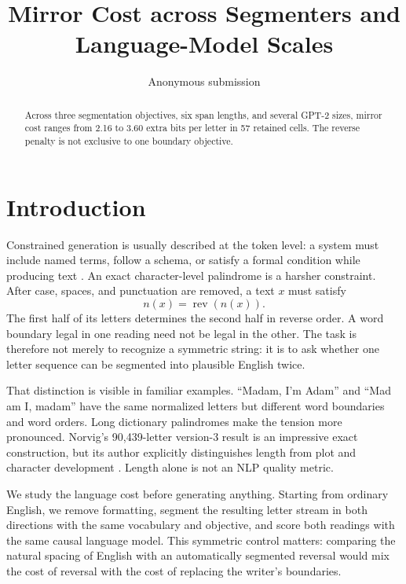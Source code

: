 \documentclass[11pt]{article}
\title{Mirror Cost across Segmenters and Language-Model Scales}
\author{Anonymous submission}
\newcommand{\norm}[1]{n(#1)}
\newcommand{\rev}{\operatorname{rev}}
\begin{document}
\maketitle

\begin{abstract}
Across three segmentation objectives, six span lengths, and several GPT-2 sizes, mirror cost ranges from 2.16 to 3.60 extra bits per letter in 57 retained cells. The reverse penalty is not exclusive to one boundary objective.
\end{abstract}

\section{Introduction}

Constrained generation is usually described at the token level: a system must
include named terms, follow a schema, or satisfy a formal condition while
producing text \citep{hokamp2017grid,post2018fast,lu2022astar}. An exact
character-level palindrome is a harsher constraint. After case, spaces, and
punctuation are removed, a text $x$ must satisfy
\begin{equation}
  \norm{x}=\rev(\norm{x}).
\end{equation}
The first half of its letters determines the second half in reverse order. A
word boundary legal in one reading need not be legal in the other. The task is
therefore not merely to recognize a symmetric string: it is to ask whether one
letter sequence can be segmented into plausible English twice.

That distinction is visible in familiar examples. ``Madam, I'm Adam'' and
``Mad am I, madam'' have the same normalized letters but different word
boundaries and word orders. Long dictionary palindromes make the tension more
pronounced. Norvig's 90,439-letter version-3 result is an impressive exact
construction, but its author explicitly distinguishes length from plot and
character development \citep{norvig2016palindrome}. Length alone is not an
NLP quality metric.

We study the language cost before generating anything. Starting from ordinary
English, we remove formatting, segment the resulting letter stream in both
directions with the same vocabulary and objective, and score both readings
with the same causal language model. This symmetric control matters: comparing
the natural spacing of English with an automatically segmented reversal would
mix the cost of reversal with the cost of replacing the writer's boundaries.
\end{document}
